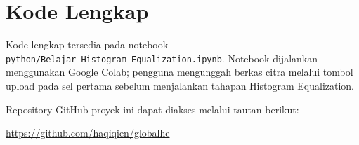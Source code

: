 \documentclass[12pt,a4paper]{article}
\begin{document}
\appendix
\section{Kode Lengkap}
Kode lengkap tersedia pada notebook \texttt{python/Belajar\_Histogram\_Equalization.ipynb}. Notebook dijalankan menggunakan Google Colab; pengguna mengunggah berkas citra melalui tombol upload pada sel pertama sebelum menjalankan tahapan Histogram Equalization.

Repository GitHub proyek ini dapat diakses melalui tautan berikut:
\begin{center}
    \url{https://github.com/haqiqien/globalhe}
\end{center}
\end{document}
